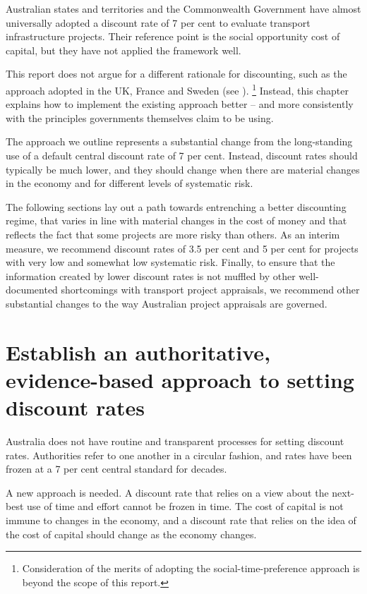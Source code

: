 \documentclass{grattan}
\begin{document}
Australian states and territories and the Commonwealth Government have almost universally adopted a discount rate of 7 per cent to evaluate transport infrastructure projects. Their reference point is the social opportunity cost of capital, but they have not applied the framework well.

This report does not argue for a different rationale for discounting, such as the approach adopted in the UK, France and Sweden (see ).%
    \footnote{Consideration of the merits of adopting the social-time-preference approach is beyond the scope of this report.}
Instead, this chapter explains how to implement the existing approach better -- and more consistently with the principles governments themselves claim to be using. 

The approach we outline represents a substantial change from the long-standing use of a default central discount rate of 7 per cent. Instead, discount rates should typically be much lower, and they should change when there are material changes in the economy and for different levels of systematic risk. 

The following sections lay out a path towards entrenching a better discounting regime, that varies in line with material changes in the cost of money and that reflects the fact that some projects are more risky than others. As an interim measure, we recommend discount rates of 3.5 per cent and 5 per cent for projects with very low and somewhat low systematic risk. Finally, to ensure that the information created by lower discount rates is not muffled by other well-documented shortcomings with transport project appraisals, we recommend other substantial changes to the way Australian project appraisals are governed.

\section{Establish an authoritative, evidence-based approach to setting discount rates}\label{subsec:ongoing-discount-rate-governance}

Australia does not have routine and transparent processes for setting discount rates. Authorities refer to one another in a circular fashion, and rates have been frozen at a 7 per cent central standard for decades.

A new approach is needed. A discount rate that relies on a view about the next-best use of time and effort cannot be frozen in time. The cost of capital is not immune to changes in the economy, and a discount rate that relies on the idea of the cost of capital should change as the economy changes.
\end{document}
